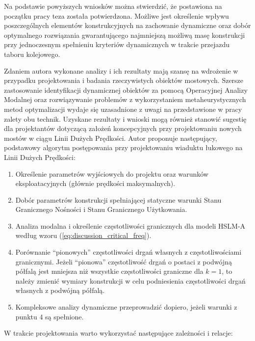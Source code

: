 Na podstawie powyższych wniosków można stwierdzić, że postawiona na początku pracy teza została potwierdzona. Możliwe jest określenie wpływu poszczególnych elementów konstrukcyjnych na zachowanie dynamiczne oraz dobór optymalnego rozwiązania gwarantującego najmniejszą możliwą masę konstrukcji przy jednoczesnym spełnieniu kryteriów dynamicznych w trakcie przejazdu taboru kolejowego.

Zdaniem autora wykonane analizy i ich rezultaty mają szansę na wdrożenie w przypadku projektowania i badania rzeczywistych obiektów mostowych. Szersze zastosowanie identyfikacji dynamicznej obiektów za pomocą Operacyjnej Analizy Modalnej oraz rozwiązywanie problemów z wykorzystaniem metaheurystycznych metod optymalizacji wydaje się uzasadnione z uwagi na przedstawione w pracy zalety obu technik. Uzyskane rezultaty i wnioski mogą również stanowić sugestię dla projektantów dotyczącą założeń koncepcyjnych przy projektowaniu nowych mostów w ciągu Linii Dużych Prędkości. Autor proponuje następujący, podstawowy algorytm postępowania przy projektowaniu wiaduktu łukowego na Linii Dużych Prędkości:
\begin{enumerate}

\item Określenie parametrów wyjściowych do projektu oraz warunków eksploatacyjnych (głównie prędkości maksymalnych).

\item Dobór parametrów konstrukcji spełniającej statyczne warunki Stanu Granicznego Nośności i Stanu Granicznego Użytkowania.

\item Analiza modalna i określenie częstotliwości granicznych dla modeli HSLM-A według wzoru (\ref{eq:discussion_critical_freq}).

\item Porównanie \enquote{pionowych} częstotliwości drgań własnych z częstotliwościami granicznymi. Jeżeli \enquote{pionowa} częstotliwość drgań o postaci z podwójną półfalą jest mniejsza niż wszystkie częstotliwości graniczne dla $k=1$, to należy zmienić wymiary konstrukcji w celu podniesienia częstotliwości drgań własnych z podwójną półfalą.

\item Kompleksowe analizy dynamiczne przeprowadzić dopiero, jeżeli warunki z punktu 4 są spełnione.

\end{enumerate}
\noindent
W trakcie projektowania warto wykorzystać następujące zależności i relacje:
